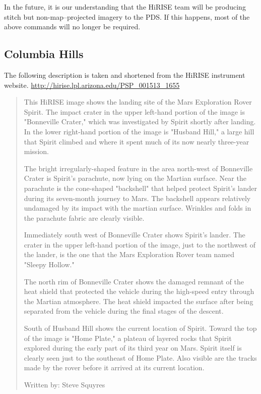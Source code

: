 In the future, it is our understanding that the HiRISE team will be
producing stitch but non-map--projected imagery to the PDS. If this
happens, most of the above commands will no longer be required.

\subsection{Columbia Hills}

The following description is taken and shortened from the HiRISE
instrument website.
\url{http://hirise.lpl.arizona.edu/PSP_001513_1655}

\begin{quotation}
This HiRISE image shows the landing site of the Mars Exploration Rover
Spirit. The impact crater in the upper left-hand portion of the image
is "Bonneville Crater," which was investigated by Spirit shortly after
landing. In the lower right-hand portion of the image is "Husband
Hill," a large hill that Spirit climbed and where it spent much of its
now nearly three-year mission.

The bright irregularly-shaped feature in the area north-west of
Bonneville Crater is Spirit's parachute, now lying on the Martian
surface. Near the parachute is the cone-shaped "backshell" that helped
protect Spirit's lander during its seven-month journey to Mars. The
backshell appears relatively undamaged by its impact with the martian
surface. Wrinkles and folds in the parachute fabric are clearly
visible.

Immediately south west of Bonneville Crater shows Spirit's lander. The
crater in the upper left-hand portion of the image, just to the
northwest of the lander, is the one that the Mars Exploration Rover
team named "Sleepy Hollow."

The north rim of Bonneville Crater shows the damaged remnant of the
heat shield that protected the vehicle during the high-speed entry
through the Martian atmosphere. The heat shield impacted the surface
after being separated from the vehicle during the final stages of the
descent.

South of Husband Hill shows the current location of Spirit. Toward the
top of the image is "Home Plate," a plateau of layered rocks that
Spirit explored during the early part of its third year on
Mars. Spirit itself is clearly seen just to the southeast of Home
Plate. Also visible are the tracks made by the rover before it arrived
at its current location.

Written by: Steve Squyres
\end{quotation}

